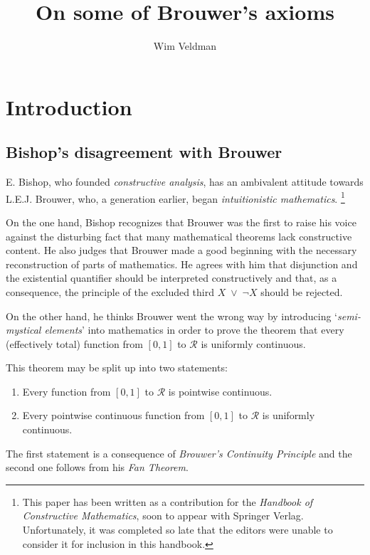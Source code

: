 \documentclass[a4paper]{amsart}
\author{Wim Veldman}
\theoremstyle{plain}
\begin{document}
\title{On some of Brouwer's axioms}
\maketitle

\section{Introduction} \subsection{ Bishop's disagreement with Brouwer}\label{SS:begin} E. Bishop, who founded {\it constructive analysis},  has an ambivalent attitude towards L.E.J. Brouwer, who, a generation earlier, began {\it intuitionistic mathematics}. \footnote{This paper has been written as a contribution for the {\it Handbook of Constructive Mathematics}, soon to appear with Springer Verlag. Unfortunately, it was completed so late that the editors were unable to consider it for inclusion in this handbook.} 

On the one hand, Bishop recognizes that Brouwer was the first to raise his voice against the disturbing fact that many mathematical theorems lack constructive content.  He also judges  that Brouwer  made a good beginning with the necessary reconstruction of parts of mathematics. He agrees with him that disjunction and the existential quantifier should be interpreted constructively and that, as a consequence, the principle of the excluded third $X\;\vee\;\neg X$ should be rejected.

On the other hand, he thinks Brouwer went the wrong way by introducing  `{\it semi-mystical elements}' into mathematics in order to prove the theorem that every (effectively total) function from $[0,1]$ to $\mathcal{R}$ is uniformly continuous. 

This theorem may be split up into two statements:
\begin{enumerate}[\upshape 1.]\item Every function from $[0,1]$ to $\mathcal{R}$ is pointwise continuous. \item Every pointwise continuous function from $[0,1]$ to $\mathcal{R}$ is uniformly continuous. \end{enumerate} 

The first statement is a consequence of {\it Brouwer's Continuity Principle} and the second one follows from his {\it Fan Theorem}.
\end{document}
